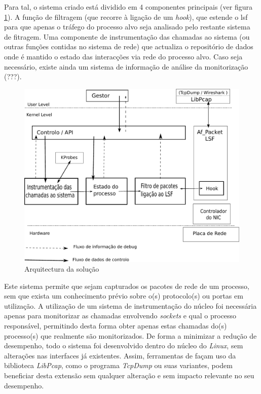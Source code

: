 \documentclass[a4paper]{llncs}
\begin{document}
Para tal, o sistema criado está dividido em 4 componentes principais (ver figura \ref{arquitectura}). A função de filtragem (que recorre à ligação de um \textit{hook}), que estende o lsf para que apenas o tráfego do processo alvo seja analisado pelo restante sistema de fitragem. Uma componente de instrumentação das chamadas ao sistema (ou outras funções contidas no sistema de rede) que actualiza o repositório de dados onde é mantido o estado das interacções via rede do processo alvo. Caso seja necessário, existe ainda um sistema de informação de análise da monitorização  (???).

\begin{figure}[htbp]
\begin{center}
\caption{Arquitectura da solução}
\label{arquitectura}
\includegraphics[scale=0.5]{interface.pdf} 
\end{center}
\end{figure}


Este sistema permite que sejam capturados os pacotes de rede de um processo, sem que exista um conhecimento prévio sobre o(s) protocolo(s) ou portas em utilização. A utilização de um sistema de instrumentação do núcleo foi necessária apenas para monitorizar as chamadas envolvendo \emph{sockets} e qual o processo responsável, permitindo desta forma obter apenas estas chamadas do(s) processo(s) que realmente são monitorizados. De forma a minimizar a redução de desempenho, todo o sistema foi desenvolvido dentro do núcleo do \textit{Linux}, sem alterações nas interfaces já existentes.  Assim, ferramentas de façam uso da biblioteca \textit{LibPcap}, como o programa \textit{TcpDump} ou suas variantes, podem beneficiar desta extensão sem qualquer alteração e sem impacto relevante no seu desempenho.
\end{document}
